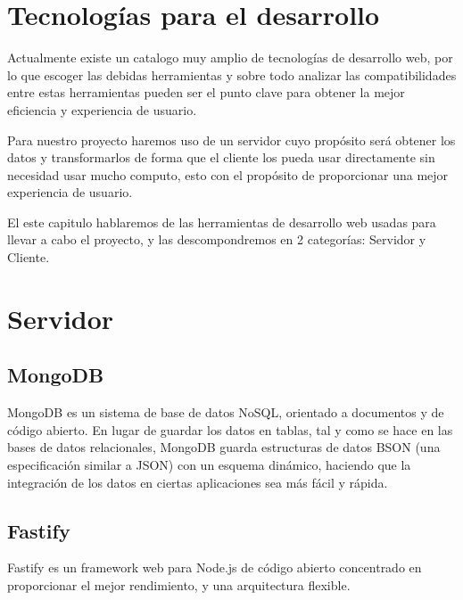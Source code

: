 \section{Tecnologías para el desarrollo}

Actualmente existe un catalogo muy amplio de tecnologías de desarrollo web, por lo que escoger las debidas herramientas y sobre todo analizar las compatibilidades entre estas herramientas pueden ser el punto clave para obtener la mejor eficiencia y experiencia de usuario.

Para nuestro proyecto haremos uso de un servidor cuyo propósito será obtener los datos y transformarlos de forma que el cliente los pueda usar directamente sin necesidad usar mucho computo, esto con el propósito de proporcionar una mejor experiencia de usuario.

El este capitulo hablaremos de las herramientas de desarrollo web usadas para llevar a cabo el proyecto, y las descompondremos en 2 categorías: Servidor y Cliente.

\section{Servidor}

\subsection{MongoDB}

MongoDB es un sistema de base de datos NoSQL, orientado a documentos y de código abierto. En lugar de guardar los datos en tablas, tal y como se hace en las bases de datos relacionales, MongoDB guarda estructuras de datos BSON (una especificación similar a JSON) con un esquema dinámico, haciendo que la integración de los datos en ciertas aplicaciones sea más fácil y rápida.

\iffalse
    \begin{figure}
        \texttt{[image: mongodb-structure.jpg]}
        \caption{Comparación de estructura de datos entre MongoDB y los RDBMS (sistema de gestión de bases de datos relacionales)}
    \end{figure}
\fi

\subsection{Fastify}

Fastify es un framework web para Node.js de código abierto concentrado en proporcionar el mejor rendimiento, y una arquitectura flexible. \\

